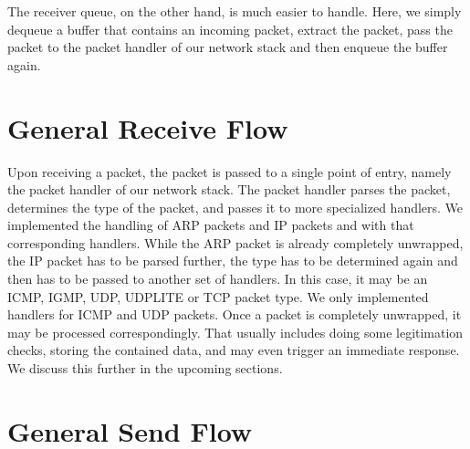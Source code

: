 The receiver queue, on the other hand, is much easier to handle. Here, we simply
dequeue a buffer that contains an incoming packet, extract the packet, pass the
packet to the packet handler of our network stack and then enqueue the buffer
again.

\section{General Receive Flow}

Upon receiving a packet, the packet is passed to a single point of entry, namely
the packet handler of our network stack.  The packet handler parses the packet,
determines the type of the packet, and passes it to more specialized handlers.
We implemented the handling of ARP packets and IP packets and with that
corresponding handlers.  While the ARP packet is already completely unwrapped,
the IP packet has to be parsed further, the type has to be determined again and
then has to be passed to another set of handlers. In this case, it may be an
ICMP, IGMP, UDP, UDPLITE or TCP packet type. We only implemented handlers for
ICMP and UDP packets.  Once a packet is completely unwrapped, it may be
processed correspondingly. That usually includes doing some legitimation checks,
storing the contained data, and may even trigger an immediate response. We
discuss this further in the upcoming sections.

\section{General Send Flow}

